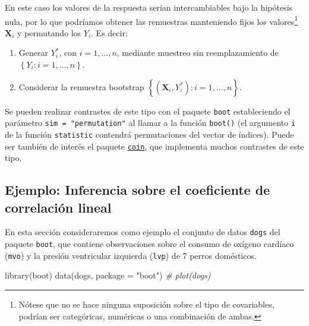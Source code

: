 \documentclass[
]{book}
\newenvironment{Shaded}{\begin{snugshade}}{\end{snugshade}}
\newcommand{\AttributeTok}[1]{\textcolor[rgb]{0.77,0.63,0.00}{#1}}
\newcommand{\CommentTok}[1]{\textcolor[rgb]{0.56,0.35,0.01}{\textit{#1}}}
\newcommand{\FunctionTok}[1]{\textcolor[rgb]{0.00,0.00,0.00}{#1}}
\newcommand{\NormalTok}[1]{#1}
\newcommand{\StringTok}[1]{\textcolor[rgb]{0.31,0.60,0.02}{#1}}
\theoremstyle{break}
\theoremstyle{definition}
\theoremstyle{definition}
\theoremstyle{definition}
\theoremstyle{definition}
\theoremstyle{remark}
\begin{document}
En este caso los valores de la respuesta serían intercambiables bajo la hipótesis nula,
por lo que podríamos obtener las remuestras manteniendo fijos los valores\footnote{Nótese que
  no se hace ninguna suposición sobre el tipo de covariables,
  podrían ser categóricas, numéricas o una combinación de ambas.}
\(\mathbf{X}_i\) y permutando los \(Y_i\). Es decir:

\begin{enumerate}
\def\labelenumi{\arabic{enumi}.}
\item
  Generar \(Y^{\ast}_i\), con \(i=1,\ldots, n\), mediante muestreo
  sin reemplazamiento de \(\left\{ Y_i: i=1,\ldots, n \right\}\).
\item
  Considerar la remuestra bootstrap
  \(\left\{ \left( \mathbf{X}_i, Y^{\ast}_i\right): i=1,\ldots, n \right\}\).
\end{enumerate}

Se pueden realizar contrastes de este tipo con el paquete \texttt{boot} estableciendo
el parámetro \texttt{sim\ =\ "permutation"} al llamar a la función \texttt{boot()} (el argumento
\texttt{i} de la función \texttt{statistic} contendrá permutaciones del vector de índices).
Puede ser también de interés el paquete \href{https://cran.r-project.org/web/packages/coin/index.html}{\texttt{coin}},
que implementa muchos contrastes de este tipo.

\hypertarget{ejemplo-inferencia-sobre-el-coeficiente-de-correlaciuxf3n-lineal}{%
\subsection{Ejemplo: Inferencia sobre el coeficiente de correlación lineal}\label{ejemplo-inferencia-sobre-el-coeficiente-de-correlaciuxf3n-lineal}}

En esta sección consideraremos como ejemplo el conjunto de datos \texttt{dogs}
del paquete \texttt{boot}, que contiene observaciones sobre el consumo de
oxígeno cardíaco (\texttt{mvo}) y la presión ventricular izquierda (\texttt{lvp})
de 7 perros domésticos.

\begin{Shaded}
\begin{Highlighting}[]
\FunctionTok{library}\NormalTok{(boot)}
\FunctionTok{data}\NormalTok{(}\StringTok{\textquotesingle{}dogs\textquotesingle{}}\NormalTok{, }\AttributeTok{package =} \StringTok{"boot"}\NormalTok{)}
\CommentTok{\# plot(dogs)}
\end{Highlighting}
\end{Shaded}
\end{document}
